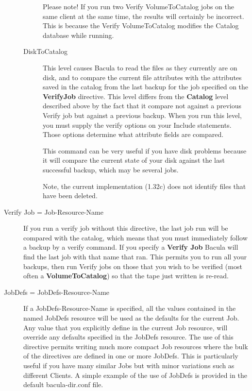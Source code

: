 \begin{description}
\begin{description}
Please note! If you  run two Verify VolumeToCatalog jobs on the same client at
the  same time, the results will certainly be incorrect. This is  because the
Verify VolumeToCatalog modifies the Catalog database  while running. 

\item [DiskToCatalog]
   This level causes Bacula to read the  files as they currently are on disk, and
to compare the  current file attributes with the attributes saved in the 
catalog from the last backup for the job specified on  the {\bf VerifyJob}
directive. This level differs from the  {\bf Catalog} level described above by
the fact that it  compare not against a previous Verify job but against a 
previous backup. When you run this level, you must supply the  verify options
on your Include statements. Those options  determine what attribute fields are
compared.  

This command can be very useful if you have disk problems  because it will
compare the current state of your disk against  the last successful backup,
which may be several jobs.  

Note, the current implementation (1.32c) does not  identify files that have
been deleted.  
\end{description}

\item [Verify Job = \lt{}Job-Resource-Name\gt{}]
   If you run  a verify job without this directive, the last job run will  be
compared with the catalog, which means that you must  immediately follow a
backup by a verify command. If you  specify a {\bf Verify Job} Bacula will
find the last  job with that name that ran. This permits you to run  all your
backups, then run Verify jobs on those that  you wish to be verified (most
often a {\bf VolumeToCatalog})  so that the tape just written is re-read. 

\item [JobDefs = \lt{}JobDefs-Resource-Name\gt{}]
   If a JobDefs-Resource-Name  is specified, all the values contained in the
named JobDefs resource  will be used as the defaults for the current Job. Any
value that  you explicitly define in the current Job resource, will override 
any defaults specified in the JobDefs resource. The use of this  directive
permits writing much more compact Job resources where the  bulk of the
directives are defined in one or more JobDefs. This  is particularly useful if
you have many similar Jobs but with  minor variations such as different
Clients. A simple example  of the use of JobDefs is provided in the default
bacula-dir.conf  file. 


\end{description}
